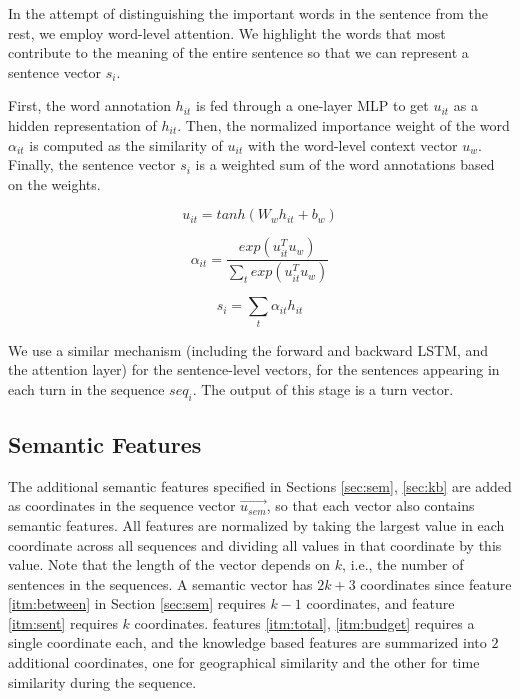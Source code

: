 In the attempt of distinguishing the important 
words in the sentence from the rest, we employ word-level 
attention. We highlight the words that most contribute 
to the meaning of the entire sentence so that we can represent 
a sentence vector $s_i$. 

First, the word annotation $h_{it}$ is fed 
through a one-layer MLP to get $u_{it}$ as a hidden representation
of $h_{it}$. Then, the normalized importance weight of the word $\alpha_{it}$ 
is computed as the similarity of $u_{it}$ with the word-level 
context vector $u_w$. 
Finally, the sentence vector $s_i$ is a weighted sum of the word annotations
based on the weights. 

\begin{equation*}
	u_{it} = tanh(W_w h_{it} + b_w)
\end{equation*}

\begin{equation*}
	\alpha_{it} = \frac{exp(u^T_{it} u_w)}{\sum_t exp(u^T_{it} u_w)}
\end{equation*}

\begin{equation*}
	s_i = \sum_{t} \alpha_{it} h_{it}
\end{equation*}

We use a similar mechanism (including the forward and backward 
LSTM, and the attention layer) for the sentence-level vectors, 
for the sentences appearing in each turn in the sequence $seq_i$. 
The output of this stage is a turn vector. 

\subsection{Semantic Features}
The additional semantic features specified 
in Sections \ref{sec:sem}, \ref{sec:kb} 
are added as coordinates in the sequence vector $\vec{u_{sem}}$, so that 
each vector also contains semantic features. 
All features are normalized by taking the largest 
value in each coordinate across all sequences and dividing 
all values in that coordinate by this value.  
Note that the length of the vector depends on $k$, 
i.e., the number of sentences in the sequences. 
A semantic vector has $2k+3$ coordinates since feature \ref{itm:between} in Section \ref{sec:sem} requires $k-1$ coordinates, and 
feature \ref{itm:sent} requires $k$ coordinates. 
features \ref{itm:total}, \ref{itm:budget} requires a single coordinate each, 
and the knowledge based features are summarized into $2$ additional coordinates, 
one for geographical similarity and the other for time similarity during the sequence. 

